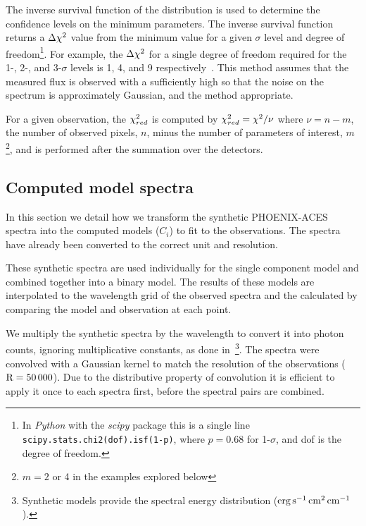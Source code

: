 The inverse survival function of the \textchisquared{} distribution is used to determine the confidence levels on the minimum \textchisquared{} parameters.
The inverse survival function returns a \(\Delta{\chi}^{2}\) value from the minimum \textchisquared{} value for a given $\sigma$ level and degree of freedom\footnote{In \emph{Python} with the \emph{scipy} package this is a single line \texttt{scipy.stats.chi2{(dof)}.isf{(1-p)}}, where \(p = 0.68\) for 1-\(\sigma\), and dof is the degree of freedom.}.
For example, the \(\Delta {\chi}^{2}\) for a single degree of freedom required for the 1-, 2-, and 3-\(\sigma\) levels is 1, 4, and 9 respectively~\citep{bevington_data_2003}.
This method assumes that the measured flux is observed with a \snr{} sufficiently high so that the noise on the spectrum is approximately Gaussian, and the \textchisquared{} method appropriate.

For a given observation, the \({\chi}^{2}_{red}\) is computed by \({\chi}^{2}_{red} = {\chi}^{2} / \nu\) where \(\nu = n - m\), the number of observed pixels, \(n\), minus the number of parameters of interest, \(m\)\footnote{\(m=2\) or 4 in the examples explored below}, and is performed after the summation over the detectors.




\subsection{Computed model spectra}
\label{models}
In this section we detail how we transform the synthetic {PHOENIX-ACES} spectra into the computed models (\(C_i\)) to fit to the observations.
The spectra have already been converted to the correct unit and resolution.

These synthetic spectra are used individually for the single component model and combined together into a binary model.
The results of these models are interpolated to the wavelength grid of the observed spectra and the \textchisquared{} calculated by comparing the model and observation at each point.


{\red{} We multiply the synthetic spectra by the wavelength to convert it into photon counts, ignoring multiplicative constants, as done in~\citet{figueira_radial_2016}\footnote{Synthetic models provide the spectral energy distribution (\(\rm erg\,s^{-1}\,cm^{2}\,cm^{-1}\)).}.
The spectra were convolved with a Gaussian kernel to match the resolution of the observations (\(\rm R=50\,000\)).
Due to the distributive property of convolution it is efficient to apply it once to each spectra first, before the spectral pairs are combined.}


